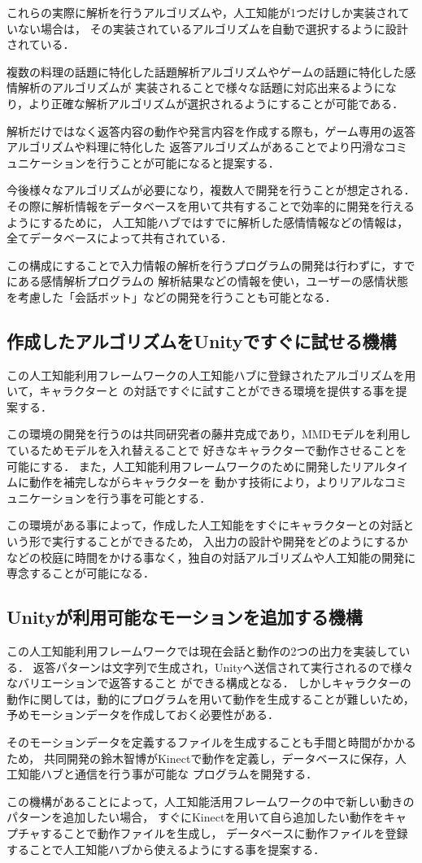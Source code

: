 これらの実際に解析を行うアルゴリズムや，人工知能が1つだけしか実装されていない場合は，
その実装されているアルゴリズムを自動で選択するように設計されている．

複数の料理の話題に特化した話題解析アルゴリズムやゲームの話題に特化した感情解析のアルゴリズムが
実装されることで様々な話題に対応出来るようになり，より正確な解析アルゴリズムが選択されるようにすることが可能である．

解析だけではなく返答内容の動作や発言内容を作成する際も，ゲーム専用の返答アルゴリズムや料理に特化した
返答アルゴリズムがあることでより円滑なコミュニケーションを行うことが可能になると提案する．

今後様々なアルゴリズムが必要になり，複数人で開発を行うことが想定される．
その際に解析情報をデータベースを用いて共有することで効率的に開発を行えるようにするために，
人工知能ハブではすでに解析した感情情報などの情報は，全てデータベースによって共有されている．

この構成にすることで入力情報の解析を行うプログラムの開発は行わずに，すでにある感情解析プログラムの
解析結果などの情報を使い，ユーザーの感情状態を考慮した「会話ボット」などの開発を行うことも可能となる．
\subsection{作成したアルゴリズムをUnityですぐに試せる機構}
この人工知能利用フレームワークの人工知能ハブに登録されたアルゴリズムを用いて，キャラクターと
の対話ですぐに試すことができる環境を提供する事を提案する．

この環境の開発を行うのは共同研究者の藤井克成であり，MMDモデルを利用しているためモデルを入れ替えることで
好きなキャラクターで動作させることを可能にする．
また，人工知能利用フレームワークのために開発したリアルタイムに動作を補完しながらキャラクターを
動かす技術により，よりリアルなコミュニケーションを行う事を可能とする．

この環境がある事によって，作成した人工知能をすぐにキャラクターとの対話という形で実行することができるため，
入出力の設計や開発をどのようにするかなどの校庭に時間をかける事なく，独自の対話アルゴリズムや人工知能の開発に専念することが可能になる．
\subsection{Unityが利用可能なモーションを追加する機構}
この人工知能利用フレームワークでは現在会話と動作の2つの出力を実装している．
返答パターンは文字列で生成され，Unityへ送信されて実行されるので様々なバリエーションで返答すること
ができる構成となる．
しかしキャラクターの動作に関しては，動的にプログラムを用いて動作を生成することが難しいため，
予めモーションデータを作成しておく必要性がある．

そのモーションデータを定義するファイルを生成することも手間と時間がかかるため，
共同開発の鈴木智博がKinectで動作を定義し，データベースに保存，人工知能ハブと通信を行う事が可能な
プログラムを開発する\cite{suzuki}．

この機構があることによって，人工知能活用フレームワークの中で新しい動きのパターンを追加したい場合，
すぐにKinectを用いて自ら追加したい動作をキャプチャすることで動作ファイルを生成し，
データベースに動作ファイルを登録することで人工知能ハブから使えるようにする事を提案する．